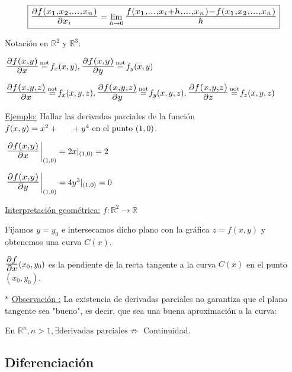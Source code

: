 \documentclass[10pt, titlepage]{article}
\newcommand{\eqc}[1]{\stackrel{\mathclap{\normalfont\mbox{\scriptsize{#1}}}}{=}}
\newcommand{\R}{\mathbb{R}}
\newcommand{\bfrac}[2]{\scalebox{1.4}{$\frac{#1}{#2}$}}
\newcommand{\observacion}[1][\!\!]{\noindent$\ast$ \underline{Observación #1:} }
\begin{document}
\[
\boxed{
\bfrac{\partial f (x_1, x_2,..., x_n)}{\partial x_i} = \displaystyle \lim_{h \to 0} \bfrac{f (x_1,..., x_i+h,...,x_n)  
- f (x_1, x_2,..., x_n)}{h}
}
\]
\vspace{3mm}

Notación en $\R^2$ y $\R^3$:
\vspace{3mm}

$\bfrac{\partial f (x, y)}{\partial x} \eqc{not} f_x (x, y), \bfrac{\partial f (x, y)}{\partial y} \eqc{not} f_y (x, y) 
$
\vspace{3mm}

$\bfrac{\partial f (x, y, z)}{\partial x} \eqc{not} f_x (x, y, z), \bfrac{\partial f (x, y, z)}{\partial y} \eqc{not} f_y (x, y, z) , \bfrac{\partial f (x, y, z)}{\partial z} \eqc{not} f_z (x, y, z)
$
\vspace{5mm}

\underline{Ejemplo:} Hallar las derivadas parciales de la función $f (x, y) = x^2 + \vspace{1mm} \\ \indent 
+ y^4 \text{ en el punto } (1, 0)$.
\vspace{3mm}

$\left.\bfrac{\partial f(x, y)}{\partial x}\right |_{(1, 0)} = 2x |_{(1, 0)} = 2$

$\left.\bfrac{\partial f(x, y)}{\partial y}\right |_{(1, 0)} = 4y^3 |_{(1, 0)} = 0$
\vspace{5mm}

\noindent\underline{Interpretación geométrica:} $f : \R^2 \to \R$
\vspace{3mm}

Fijamos $y = y_0$ e intersecamos dicho plano con la gráfica $z = f (x, y)$ y obtenemos una curva $C (x)$.

$\bfrac{\partial f}{\partial x} (x_0, y_0)$ es la pendiente de la recta tangente a la curva $C (x)$ en el punto 
$(x_0, y_0)$.
\vspace{3mm}

\observacion La existencia de derivadas parciales no garantiza que el plano tangente sea "bueno", es decir, 
que sea una buena aproximación a la curva:
\vspace{3mm}

En $\R^n, n >1, \exists \text{derivadas parciales} \not\Rightarrow$ Continuidad.
\vspace{5mm}


\subsection{Diferenciación}
\vspace{3mm}
\end{document}
